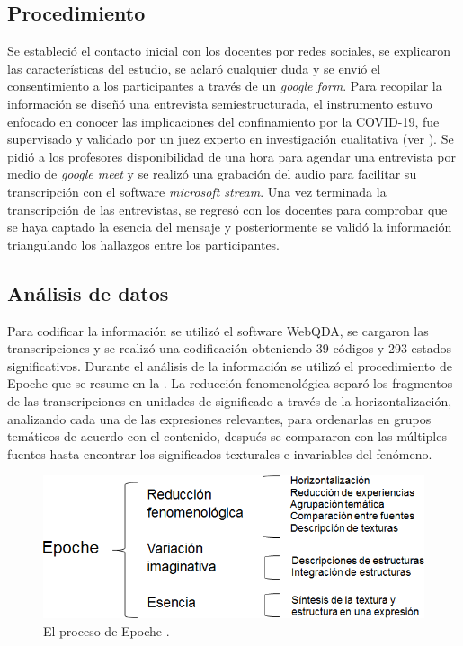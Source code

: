 \documentclass[spanish]{textolivre}
\begin{document}
\subsection{Procedimiento}

Se estableció el contacto inicial con los docentes por redes sociales, se explicaron las características del estudio, se aclaró cualquier duda y se envió el consentimiento a los participantes a través de un \textit{google form}. Para recopilar la información se diseñó una entrevista semiestructurada, el instrumento estuvo enfocado en conocer las implicaciones del confinamiento por la COVID-19, fue supervisado y validado por un juez experto en investigación cualitativa (ver ). Se pidió a los profesores disponibilidad de una hora para agendar una entrevista por medio de \textit{google meet} y se realizó una grabación del audio para facilitar su transcripción con el software \textit{microsoft stream}. Una vez terminada la transcripción de las entrevistas, se regresó con los docentes para comprobar que se haya captado la esencia del mensaje y posteriormente se validó la información triangulando los hallazgos entre los participantes.

\subsection{Análisis de datos}

Para codificar la información se utilizó el software WebQDA, se cargaron las transcripciones y se realizó una codificación obteniendo 39 códigos y 293 estados significativos. Durante el análisis de la información se utilizó el procedimiento de Epoche \cite{husserl_crisis_1970,moustakas_phenomenological_1994} que se resume en la . La reducción fenomenológica separó los fragmentos de las transcripciones en unidades de significado a través de la horizontalización, analizando cada una de las expresiones relevantes, para ordenarlas en grupos temáticos de acuerdo con el contenido, después se compararon con las múltiples fuentes hasta encontrar los significados texturales e invariables del fenómeno. 

\begin{figure}[h!]
\centering
\begin{minipage}{.9\textwidth}
\includegraphics[width=\textwidth]{figura01.png}
\caption{El proceso de Epoche \cite{husserl_crisis_1970,moustakas_phenomenological_1994}.}
\label{Figura01}
\end{minipage}
\end{figure}
\end{document}
